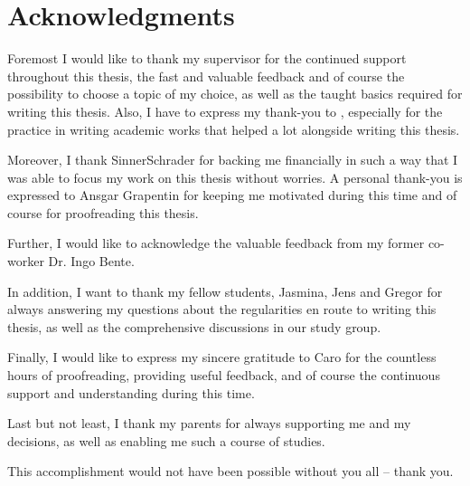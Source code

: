 \chapter*{Acknowledgments}
\thispagestyle{noheader}

Foremost I would like to thank my supervisor \firstTutor for the continued support throughout this thesis, the fast and valuable feedback and of course the possibility to choose a topic of my choice, as well as the taught basics required for writing this thesis. Also, I have to express my thank-you to \secondTutor, especially for the practice in writing academic works that helped a lot alongside writing this thesis.

Moreover, I thank SinnerSchrader for backing me financially in such a way that I was able to focus my work on this thesis without worries. A personal thank-you is expressed to Ansgar Grapentin for keeping me motivated during this time and of course for proofreading this thesis.

Further, I would like to acknowledge the valuable feedback from my former co-worker Dr. Ingo Bente.

In addition, I want to thank my fellow students, Jasmina, Jens and Gregor for always answering my questions about the regularities en route to writing this thesis, as well as the comprehensive discussions in our study group.

Finally, I would like to express my sincere gratitude to Caro for the countless hours of proofreading, providing useful feedback, and of course the continuous support and understanding during this time.

Last but not least, I thank my parents for always supporting me and my decisions, as well as enabling me such a course of studies.

This accomplishment would not have been possible without you all -- thank you.

\newpage